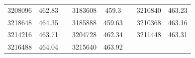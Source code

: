 \documentclass[12pt]{mwart}
\begin{document}
\begin{table}[H]
\begin{tabular}{cclcclcc}
		3208096                                                  & 462.83                                                        &  & 3183608                                                  & 459.3                                                         &  & 3210840                                                  & 463.23                                                        \\
		3218648                                                  & 464.35                                                        &  & 3185888                                                  & 459.63                                                        &  & 3210368                                                  & 463.16                                                        \\
		3214216                                                  & 463.71                                                        &  & 3204728                                                  & 462.34                                                        &  & 3211448                                                  & 463.31                                                        \\
		3216488                                                  & 464.04                                                        &  & 3215640                                                  & 463.92                                                        &  & \multicolumn{1}{l}{}                                     & \multicolumn{1}{l}{}                                         
	\end{tabular}
	\end{table}

	
\end{document}
